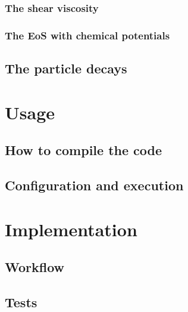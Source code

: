 \documentclass[12pt, a4paper]{report}
\begin{document}
	\section{The shear viscosity}
	\section{The EoS with chemical potentials}
	
	\chapter{The particle decays}
\part{Usage}
\chapter{How to compile the code}
\chapter{Configuration and execution}
\part{Implementation}
\chapter{Workflow}
\chapter{Tests}
\end{document}
